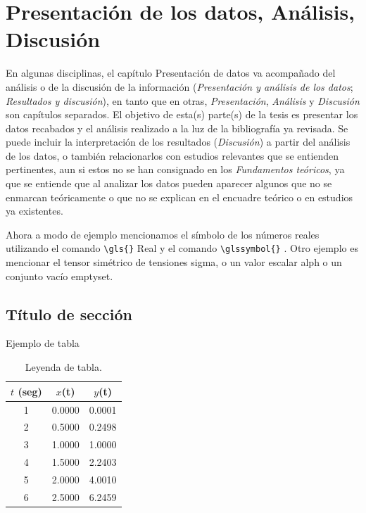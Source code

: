 \chapter{Presentación de los datos, Análisis, Discusión}

En algunas disciplinas, el capítulo Presentación de datos va acompañado del análisis o de la discusión de la información (\textit{Presentación y análisis de los datos}; \textit{Resultados y discusión}), en tanto que en otras, \textit{Presentación}, \textit{Análisis} y \textit{Discusión} son capítulos separados.
El objetivo de esta(s) parte(s) de la tesis es presentar los datos recabados y el análisis realizado a la luz de la bibliografía ya revisada. Se puede incluir la interpretación de los resultados (\textit{Discusión}) a partir del análisis de los datos, o también relacionarlos con estudios relevantes que se entienden pertinentes, aun si estos no se han consignado en los \textit{Fundamentos teóricos}, ya que se entiende que al analizar los datos pueden aparecer algunos que no se enmarcan teóricamente o que no se explican en el encuadre teórico o en estudios ya existentes.

Ahora a modo de ejemplo mencionamos el símbolo de los números reales utilizando el comando \verb|\gls{}| \gls{Real} y el comando \verb|\glssymbol{}| . Otro ejemplo es mencionar el tensor simétrico de tensiones \gls{sigma}, o un valor escalar  \gls{alph} o un conjunto vacío \gls{emptyset}.

\newpage 


\section{Título de sección}

Ejemplo de tabla

\begin{table}[h!]
\centering
\caption{Leyenda de tabla.}
\label{tab:comp}
\begin{tabular}{|c|c|c|}
  \hline
  $t$ (seg) & $x$(t) & $y$(t)\\
  \hline
  1 & 0.0000 & 0.0001\\
  2 & 0.5000 & 0.2498\\
  3 & 1.0000 & 1.0000\\
  4 & 1.5000 & 2.2403\\
  5 & 2.0000 & 4.0010\\
  6 & 2.5000 & 6.2459\\
  \hline
\end{tabular}
\end{table}

